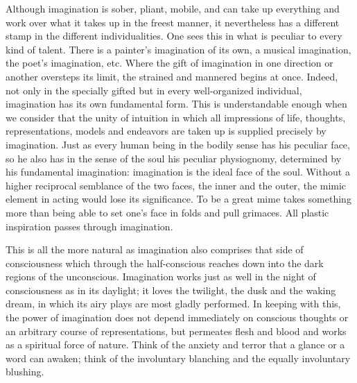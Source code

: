 \documentclass[12pt,a4paper,openany]{book}
\newcommand{\opage}[1]{\marginnote{\footnotesize\textit{[#1]}}}
\begin{document}
Although imagination is sober, pliant, mobile, and can take up everything and work over what it takes up in the freest manner, it nevertheless has a different stamp in the different individualities. One sees this in what is peculiar to every kind of talent. There is a painter's imagination of its own, a musical imagination, the poet's imagination, etc. Where the gift of imagination in one direction or another oversteps its limit, the strained and mannered begins at once. Indeed, not only in the specially gifted but in every well-organized individual, imagination has its own fundamental form. This is understandable enough when we consider that the unity of intuition in which all impressions of life, thoughts, representations, models and endeavors are taken up is supplied precisely by imagination. Just as every human being in the bodily sense has his peculiar face, so he also has in the sense of the soul his peculiar physiognomy, determined by his fundamental imagination: imagination is the ideal face of the soul. Without a higher reciprocal semblance of the two faces, the inner and the outer, the mimic element in acting would lose its significance. To be a great mime takes something more than being able to set one's face in folds and pull grimaces. All plastic inspiration passes through imagination.

This is all the more natural as imagination also comprises that side of consciousness which through the half-conscious reaches down into the dark regions of the unconscious. Imagination works just as well in the night of consciousness as in its daylight; it loves the twilight,
\setcounter{footnote}{0}%
\opage{78}the dusk and the waking dream, in which its airy plays are most gladly performed. In keeping with this, the power of imagination does not depend immediately on conscious thoughts or an arbitrary course of representations, but permeates flesh and blood and works as a spiritual force of nature. Think of the anxiety and terror that a glance or a word can awaken; think of the involuntary blanching and the equally involuntary blushing.
\end{document}
